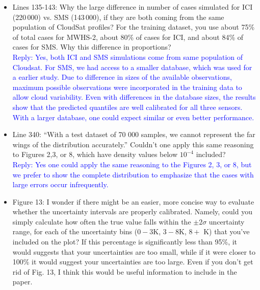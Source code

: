 \documentclass[11pt,a4paper]{article}
\begin{document}
\begin{itemize}
\item  
			Lines 135-143: Why the large difference in number of cases simulated for ICI (220\,000)
			vs. SMS (143\,000), if they are both coming from the same population of CloudSat
			profiles? For the training dataset, you use about 75\% of total cases for MWHS-2,
			about 80\% of cases for ICI, and about 84\% of cases for SMS. Why this difference in
			proportions?\\

\textcolor{blue}{Reply: Yes, both ICI and SMS simulations come from same population of Cloudsat. For SMS, we had access to a smaller database, which was used for a earlier study. Due to difference in sizes of the available observations, maximum possible observations were incorporated in the training data to allow cloud variability. Even with differences in the database sizes, the results show that the predicted quantiles are well calibrated for all three sensors. With a larger database, one could expect similar or even better performance.}\\

\item  
			Line 340: ``With a test dataset of 70 000 samples, we cannot represent the far wings of the distribution accurately.'' Couldn't one apply this same reasoning to Figures 2,3, or
			8, which have density values below $10^{-4}$ included?\\

\textcolor{blue}{Reply: Yes one could apply the same reasoning to the Figures 2, 3, or 8, but we prefer to show the complete distribution to emphasize that the cases with large errors occur infrequently.}\\


\item 
			Figure 13: I wonder if there might be an easier, more concise way to evaluate whether
			the uncertainty intervals are properly calibrated. Namely, could you simply calculate
			how often the true value falls within the $\pm2\sigma$ uncertainty range, for each of the uncertainty bins ($0 - 3$K, $3 - 8$K, $8 +$ K) that you've included on the plot? If this percentage is significantly less than 95\%, it would suggests that your uncertainties are too small, while if it were closer to 100\% it would suggest your uncertainties are too large. Even if you don't get rid of Fig. 13, I think this would be useful information to include in the paper.\\


\end{itemize}
\end{document}
